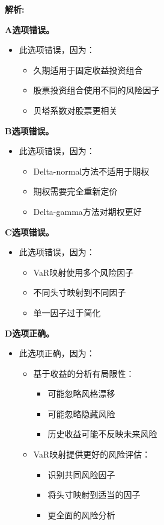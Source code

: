 \documentclass{article}
\newenvironment{explanation}
{\textbf{解析:}\par}
{\par}
\begin{document}
\begin{explanation}
    \textbf{A选项错误。}
    \begin{itemize}
        \item 此选项错误，因为：
        \begin{itemize}
            \item 久期适用于固定收益投资组合
            \item 股票投资组合使用不同的风险因子
            \item 贝塔系数对股票更相关
        \end{itemize}
    \end{itemize}
    \textbf{B选项错误。}
    \begin{itemize}
        \item 此选项错误，因为：
        \begin{itemize}
            \item Delta-normal方法不适用于期权
            \item 期权需要完全重新定价
            \item Delta-gamma方法对期权更好
        \end{itemize}
    \end{itemize}
    \textbf{C选项错误。}
    \begin{itemize}
        \item 此选项错误，因为：
        \begin{itemize}
            \item VaR映射使用多个风险因子
            \item 不同头寸映射到不同因子
            \item 单一因子过于简化
        \end{itemize}
    \end{itemize}
    \textbf{D选项正确。}
    \begin{itemize}
        \item 此选项正确，因为：
        \begin{itemize}
            \item 基于收益的分析有局限性：
            \begin{itemize}
                \item 可能忽略风格漂移
                \item 可能忽略隐藏风险
                \item 历史收益可能不反映未来风险
            \end{itemize}
            \item VaR映射提供更好的风险评估：
            \begin{itemize}
                \item 识别共同风险因子
                \item 将头寸映射到适当的因子
                \item 更全面的风险分析
            \end{itemize}
        \end{itemize}
    \end{itemize}
\end{explanation}
\end{document}

